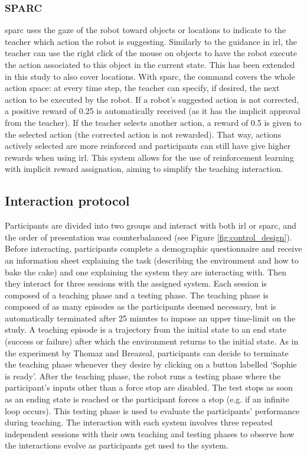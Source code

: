 \subsubsection{SPARC}

\gls{sparc} uses the gaze of the robot toward objects or locations to indicate to the teacher which action the robot is suggesting. Similarly to the guidance in \gls{irl}, the teacher can use the right click of the mouse on objects to have the robot execute the action associated to this object in the current state. This has been extended in this study to also cover locations. With \gls{sparc}, the command covers the whole action space: at every time step, the teacher can specify, if desired, the next action to be executed by the robot. If a robot's suggested action is not corrected, a positive reward of 0.25 is automatically received (as it has the implicit approval from the teacher). If the teacher selects another action, a reward of 0.5 is given to the selected action (the corrected action is not rewarded). That way, actions actively selected are more reinforced and participants can still have give higher rewards when using \gls{irl}. This system allows for the use of reinforcement learning with implicit reward assignation, aiming to simplify the teaching interaction.

\subsection{Interaction protocol}

Participants are divided into two groups and interact with both \gls{irl} or \gls{sparc}, and the order of presentation was counterbalanced (see Figure \ref{fig:control_design}). Before interacting, participants complete a demographic questionnaire and receive an information sheet explaining the task (describing the environment and how to bake the cake) and one explaining the system they are interacting with. Then they interact for three sessions with the assigned system. Each session is composed of a teaching phase and a testing phase. The teaching phase is composed of as many episodes as the participants deemed necessary, but is automatically terminated after 25 minutes to impose an upper time-limit on the study. A teaching episode is a trajectory from the initial state to an end state (success or failure) after which the environment returns to the initial state. As in the experiment by Thomaz and Breazeal, participants can decide to terminate the teaching phase whenever they desire by clicking on a button labelled `Sophie is ready'. After the teaching phase, the robot runs a testing phase where the participant's inputs other than a force stop are disabled. The test stops as soon as an ending state is reached or the participant forces a stop (e.g. if an infinite loop occurs). This testing phase is used to evaluate the participants' performance during teaching. The interaction with each system involves three repeated independent sessions with their own teaching and testing phases to observe how the interactions evolve as participants get used to the system.


